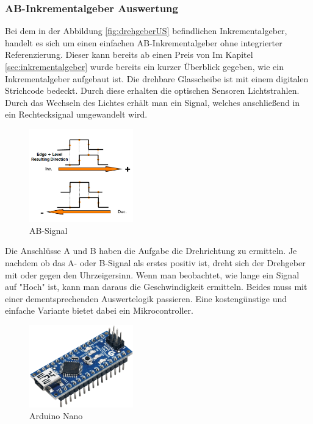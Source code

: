 \subsubsection{AB-Inkrementalgeber Auswertung}
\label{sec:auswertungInkrementalgeber}

Bei dem in der Abbildung \ref{fig:drehgeberUS} befindlichen Inkrementalgeber, handelt es sich um einen einfachen AB-Inkrementalgeber ohne integrierter Referenzierung. Dieser kann bereits ab einen Preis von Im Kapitel \ref{sec:inkrementalgeber} wurde bereits ein kurzer Überblick gegeben, wie ein Inkrementalgeber aufgebaut ist. Die drehbare Glasscheibe ist mit einem digitalen Strichcode bedeckt. Durch diese erhalten die optischen Sensoren Lichtstrahlen. Durch das Wechseln des Lichtes erhält man ein Signal, welches anschließend in ein Rechtecksignal umgewandelt wird. 

\begin{figure}[H]
\begin{center}
	\includegraphics[width=0.4\textwidth]{fig/ABSignal}
	\caption{AB-Signal \cite{aufbauInkrementalgeber}}
\end{center}
\end{figure}

Die Anschlüsse A und B haben die Aufgabe die Drehrichtung zu ermitteln. Je nachdem ob das A- oder B-Signal als erstes positiv ist, dreht sich der Drehgeber mit oder gegen den Uhrzeigersinn. Wenn man beobachtet, wie lange ein Signal auf "{}Hoch"{} ist, kann man daraus die Geschwindigkeit ermitteln. Beides muss mit einer dementsprechenden Auswertelogik passieren. Eine kostengünstige und einfache Variante bietet dabei ein Mikrocontroller. 

\begin{figure}[H]
\begin{center}
	\includegraphics[width=0.4\textwidth]{fig/nano}
	\caption{Arduino Nano \cite{arduino}}
\end{center}
\end{figure}

